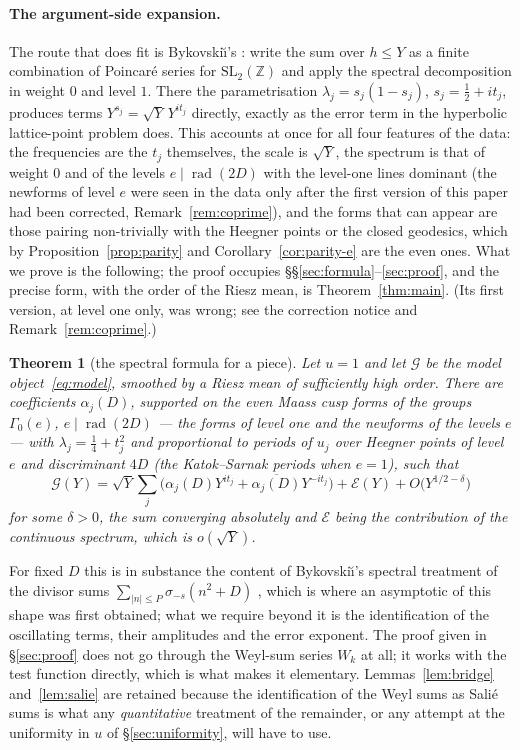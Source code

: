 \documentclass[11pt,a4paper]{article}
\newtheorem{theorem}{Theorem}
\theoremstyle{remark}\newtheorem{remark}[theorem]{Remark}
\newcommand{\Z}{\mathbb Z}\newcommand{\R}{\mathbb R}\newcommand{\Q}{\mathbb Q}\newcommand{\C}{\mathbb C}
\begin{document}
\paragraph{The argument-side expansion.} The route that does fit is Bykovski\u\i's \cite{Bykovskii1984}: write the
sum over $h\le Y$ as a finite combination of Poincar\'e series for $\mathrm{SL}_2(\Z)$ and apply the spectral
decomposition in weight $0$ and level $1$. There the parametrisation $\lambda_j=s_j(1-s_j)$, $s_j=\tfrac12+it_j$,
produces terms $Y^{s_j}=\sqrt Y\,Y^{it_j}$ directly, exactly as the error term in the hyperbolic lattice-point
problem does. This accounts at once for all four features of the data: the frequencies are the $t_j$ themselves, the
scale is $\sqrt Y$, the spectrum is that of weight $0$ and of the levels $e\mid\operatorname{rad}(2D)$ with the
level-one lines dominant (the newforms of level $e$ were seen in the data only after the first version of this paper
had been corrected, Remark~\ref{rem:coprime}), and the forms that can appear are those pairing
non-trivially with the Heegner points or the closed geodesics, which by
Proposition~\ref{prop:parity} and Corollary~\ref{cor:parity-e} are the even ones. What we prove is the following; the proof occupies
\S\S\ref{sec:formula}--\ref{sec:proof}, and the precise form, with the order of the Riesz mean, is
Theorem~\ref{thm:main}. (Its first version, at level one only, was wrong; see the correction notice and
Remark~\ref{rem:coprime}.)

\begin{theorem}[the spectral formula for a piece]\label{thm:K}
Let $u=1$ and let $\mathcal G$ be the model object~\eqref{eq:model}, smoothed by a Riesz mean of sufficiently high
order. There are coefficients $\alpha_j(D)$, supported on the even Maass cusp forms of the groups $\Gamma_0(e)$,
$e\mid\operatorname{rad}(2D)$ --- the forms of level one and the newforms of the levels $e$ --- with
$\lambda_j=\tfrac14+t_j^2$ and proportional to periods of $u_j$ over Heegner points of level $e$ and discriminant
$4D$ (the Katok--Sarnak periods when $e=1$), such that
\[
\mathcal G(Y)=\sqrt Y\sum_{j}\bigl(\alpha_j(D)Y^{it_j}+\overline{\alpha_j(D)}Y^{-it_j}\bigr)+\mathcal E(Y)+O\bigl(Y^{1/2-\delta}\bigr)
\]
for some $\delta>0$, the sum converging absolutely and $\mathcal E$ being the contribution of the continuous
spectrum, which is $o(\sqrt Y)$.
\end{theorem}

For fixed $D$ this is in substance the content of Bykovski\u\i's spectral treatment of the divisor sums
$\sum_{|n|\le P}\sigma_{-s}(n^2+D)$ \cite{Bykovskii1984}, which is where an asymptotic of this shape was first
obtained; what we require beyond it is the identification of the oscillating terms, their amplitudes and the error
exponent. The proof given in \S\ref{sec:proof} does not go through the Weyl-sum series $W_k$ at all; it works with
the test function directly, which is what makes it elementary. Lemmas~\ref{lem:bridge} and~\ref{lem:salie} are retained because the identification of the Weyl sums as
Sali\'e sums is what any \emph{quantitative} treatment of the remainder, or any attempt at the uniformity in $u$ of
\S\ref{sec:uniformity}, will have to use.
\end{document}
